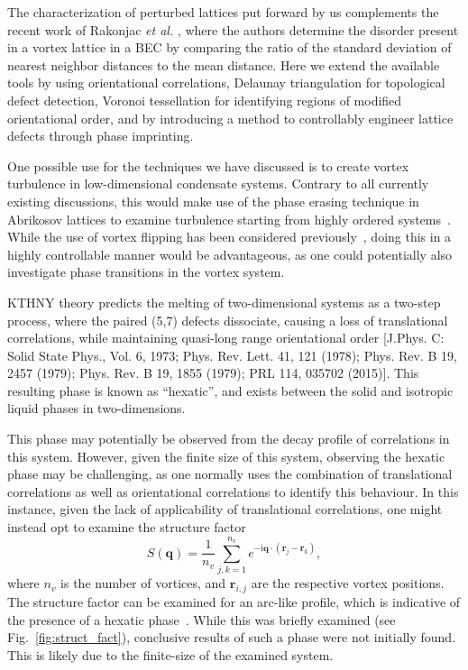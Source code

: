 The characterization of perturbed lattices put forward by us complements the recent work of Rakonjac \textit{et al.} \cite{VTX:Rankonjac_pra_2016}, where the authors determine the disorder present in a vortex lattice in a BEC by comparing the ratio of the standard deviation of nearest neighbor distances to the mean distance. Here we extend the available tools by using orientational correlations, Delaunay triangulation for topological defect detection, Voronoi tessellation for identifying regions of modified orientational order, and by introducing a method to controllably engineer lattice defects through phase imprinting.

One possible use for the techniques we have discussed is to create vortex turbulence in low-dimensional condensate systems. Contrary to all currently existing discussions, this would make use of the phase erasing technique in Abrikosov lattices to examine turbulence starting from highly ordered systems~\cite{VTX:Neely_prl_2013,VTX:Kwon_pra_2014,VTX:Groszek_pra_2016}. While the use of vortex flipping has been considered previously~\cite{VTX:Madarassy_gfd_2009}, doing this in a highly controllable manner would be advantageous, as one could potentially also investigate phase transitions in the vortex system.

KTHNY theory predicts the melting of two-dimensional systems as a two-step process, where the paired (5,7) defects dissociate, causing a loss of translational correlations, while maintaining quasi-long range orientational order [J.Phys. C: Solid State Phys., Vol. 6, 1973; Phys. Rev. Lett. 41, 121 (1978); Phys. Rev. B 19, 2457 (1979); Phys. Rev. B 19, 1855 (1979); PRL 114, 035702 (2015)]. This resulting phase is known as ``hexatic'', and exists between the solid and isotropic liquid phases in two-dimensions.


This phase may potentially be observed from the decay profile of correlations in this system. However, given the finite size of this system, observing the hexatic phase may be challenging, as one normally uses the combination of translational correlations as well as orientational correlations to identify this behaviour. In this instance, given the lack of applicability of translational correlations, one might instead opt to examine the structure factor \[S(\mathbf{q}) = \frac{1}{n_v}\displaystyle\sum\limits_{j,k=1}^{n_v} e^{-\textrm{i}\mathbf{q}\cdot(\mathbf{r}_j - \mathbf{r}_k)},\] where $n_v$ is the number of vortices, and $\mathbf{r}_{i,j}$ are the respective vortex positions. The structure factor can be examined for an arc-like profile, which is indicative of the presence of a hexatic phase~\cite{CM:Brodin_cmp_2010,CM:Sun_scirep_2016}. While this was briefly examined (see Fig.~\ref{fig:struct_fact}), conclusive results of such a phase were not initially found. This is likely due to the finite-size of the examined system.

